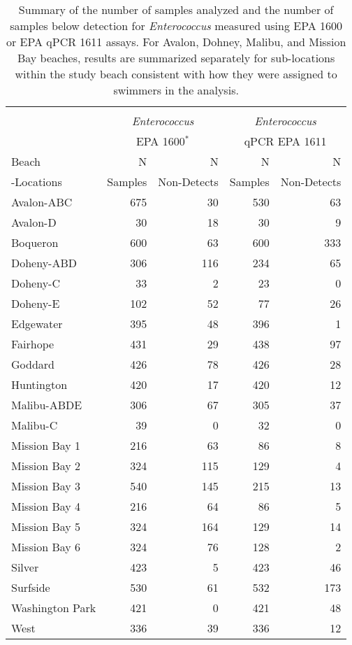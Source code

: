 \documentclass[12pt]{article}\usepackage[]{graphicx}\usepackage[]{color}
\begin{document}
\clearpage
\begin{table}[h!tb]
\begin{center}
\caption{Summary of the number of samples analyzed and the number of samples below detection for \textit{Enterococcus} measured using EPA 1600 or EPA qPCR 1611 assays.   For Avalon, Dohney, Malibu, and Mission Bay beaches, results are summarized separately for sub-locations within the study beach consistent with how they were assigned to swimmers in the analysis. \label{tab:wqsamplesum}}
\begin{tabular}{l rr rr}
 & \\
  & \multicolumn{2}{c}{\textit{Enterococcus}} & \multicolumn{2}{c}{\textit{Enterococcus}} \\
 & \multicolumn{2}{c}{EPA 1600$^*$}           & \multicolumn{2}{c}{qPCR EPA 1611} \\
Beach      & N       & N           & N       & N            \\
-Locations & Samples & Non-Detects & Samples & Non-Detects   \\
\hline
 Avalon-ABC & 675 & 30 & 530 & 63 \\ 
  Avalon-D & 30 & 18 & 30 & 9 \\ 
  Boqueron & 600 & 63 & 600 & 333 \\ 
  Doheny-ABD & 306 & 116 & 234 & 65 \\ 
  Doheny-C & 33 & 2 & 23 & 0 \\ 
  Doheny-E & 102 & 52 & 77 & 26 \\ 
  Edgewater & 395 & 48 & 396 & 1 \\ 
  Fairhope & 431 & 29 & 438 & 97 \\ 
  Goddard & 426 & 78 & 426 & 28 \\ 
  Huntington & 420 & 17 & 420 & 12 \\ 
  Malibu-ABDE & 306 & 67 & 305 & 37 \\ 
  Malibu-C & 39 & 0 & 32 & 0 \\ 
  Mission Bay 1 & 216 & 63 & 86 & 8 \\ 
  Mission Bay 2 & 324 & 115 & 129 & 4 \\ 
  Mission Bay 3 & 540 & 145 & 215 & 13 \\ 
  Mission Bay 4 & 216 & 64 & 86 & 5 \\ 
  Mission Bay 5 & 324 & 164 & 129 & 14 \\ 
  Mission Bay 6 & 324 & 76 & 128 & 2 \\ 
  Silver & 423 & 5 & 423 & 46 \\ 
  Surfside & 530 & 61 & 532 & 173 \\ 
  Washington Park & 421 & 0 & 421 & 48 \\ 
  West & 336 & 39 & 336 & 12 \\ 
  

\end{tabular}
\end{center}
\end{table}
\end{document}
